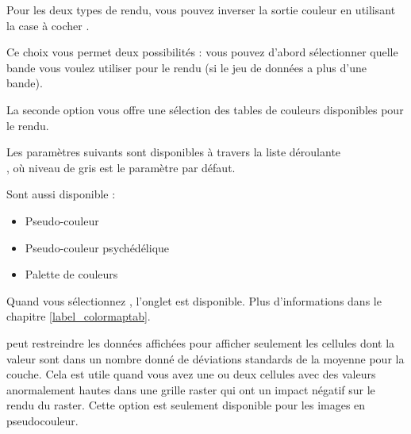 Pour les deux types de rendu, vous pouvez inverser la sortie couleur en
utilisant la case à cocher .


Ce choix vous permet deux possibilités : vous pouvez d'abord sélectionner
quelle bande vous voulez utiliser pour le rendu (si le jeu de données a plus
d'une bande).

La seconde option vous offre une sélection des tables de couleurs disponibles
pour le rendu.

Les paramètres suivants sont disponibles à travers la liste déroulante\\
, où niveau de gris est le 
paramètre par défaut.

Sont aussi disponible :
\begin{itemize}[label=--]
\item Pseudo-couleur
\item Pseudo-couleur psychédélique
\item Palette de couleurs
\end{itemize}

Quand vous sélectionnez , l'onglet
 est disponible. Plus d'informations dans le chapitre
\ref{label_colormaptab}.

\qg peut restreindre les données affichées pour afficher seulement les
cellules dont la valeur sont dans un nombre donné de déviations standards de la moyenne pour la couche. Cela est utile quand vous avez une ou deux cellules avec des valeurs anormalement hautes dans une grille raster qui ont un impact négatif sur le rendu du raster. Cette option est seulement disponible pour les images en pseudocouleur.

